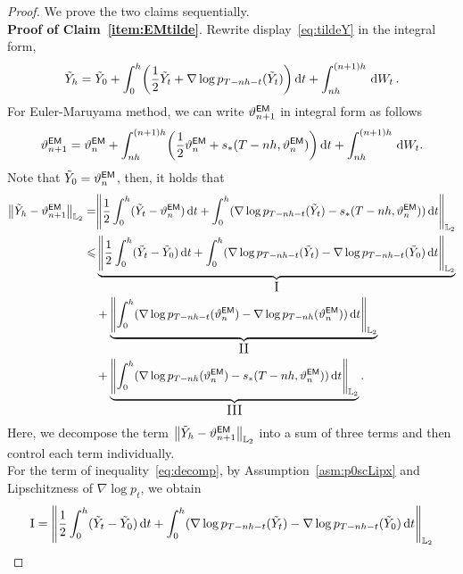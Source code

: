 \begin{proof}
We prove the two claims sequentially.\\
\textbf{Proof of Claim~\ref{item:EMtilde}}. Rewrite display~\eqref{eq:tildeY} in the integral form,
\begin{align*}
    \tilde{Y}_h=\tilde{Y}_0+\int_{0}^{h}\left(\dfrac{1}{2}\tilde{Y}_t+\nabla\log p_{T-nh-t}(\tilde{Y}_t)\right)\rmd t+\int_{nh}^{(n+1)h}\rmd W_t \,.
\end{align*}
For Euler-Maruyama method, we can write $\vartheta_{n+1}^{\sf EM}$ in integral form as follows
\begin{align*}
    \vartheta_{n+1}^{\sf EM}=\vartheta_n^{\sf EM}+\int_{nh}^{(n+1)h}\left(\dfrac{1}{2}\vartheta_n^{\sf EM}+s_*(T-nh,\vartheta_n^{\sf EM})\right)\rmd t+\int_{nh}^{(n+1)h}\rmd W_t.
\end{align*}
Note that $\tilde Y_0=\vartheta_n^{\sf EM}$, then, it holds that
\begin{equation}
    \begin{aligned}
        \l|\tilde{Y}_h-\vartheta_{n+1}^{\sf EM}\r|_{\Ltwo}=&\left\lVert\dfrac{1}{2}\int_0^h(\tilde{Y}_t-\vartheta_n^{\sf EM})\rmd t+\int_0^h(\nabla\log p_{T-nh-t}(\tilde{Y}_t)-s_*(T-nh,\vartheta_n^{\sf EM}))\rmd t\right\rVert_{\Ltwo}\\
        \leqslant&\underbrace{\left\lVert\dfrac{1}{2}\int_0^h(\tilde{Y}_t-\tilde{Y}_0)\rmd t+\int_0^h(\nabla\log p_{T-nh-t}(\tilde{Y}_t)-\nabla\log p_{T-nh-t}(\tilde{Y}_0)\rmd t\right\rVert_{\Ltwo}}_{\text{\large I}}\\
        &+\underbrace{\left\lVert \int_0^h(\nabla\log p_{T-nh-t}(\vartheta_n^{\sf EM})-\nabla\log p_{T-nh}(\vartheta_n^{\sf EM}))\rmd t\right\rVert_{\Ltwo}}_{\text{\large II}}\\
        &+\underbrace{\left\lVert\int_0^h(\nabla\log p_{T-nh}(\vartheta_n^{\sf EM})-s_*(T-nh,\vartheta_n^{\sf EM}))\rmd t\right\rVert_{\Ltwo}}_{\text{\large III}}.
    \end{aligned}
    \label{eq:decomp}
\end{equation}
Here, we decompose the term $ \l|\tilde{Y}_h-\vartheta_{n+1}^{\sf EM}\r|_{\Ltwo}$ into a sum of three terms and then control each term individually.\\
For the term  of inequality~\eqref{eq:decomp}, by Assumption~\ref{asm:p0scLipx} and  Lipschitzness of $\nabla\log p_t$, we obtain 
\begin{align*}
    \rm{I}&=\left\lVert\dfrac{1}{2}\int_0^h(\tilde{Y}_t-\tilde{Y}_0)\rmd t+\int_0^h(\nabla\log p_{T-nh-t}(\tilde{Y}_t)-\nabla\log p_{T-nh-t}(\tilde{Y}_0)\rmd t\right\rVert_{\Ltwo}\\

\end{align*}
\end{proof}
